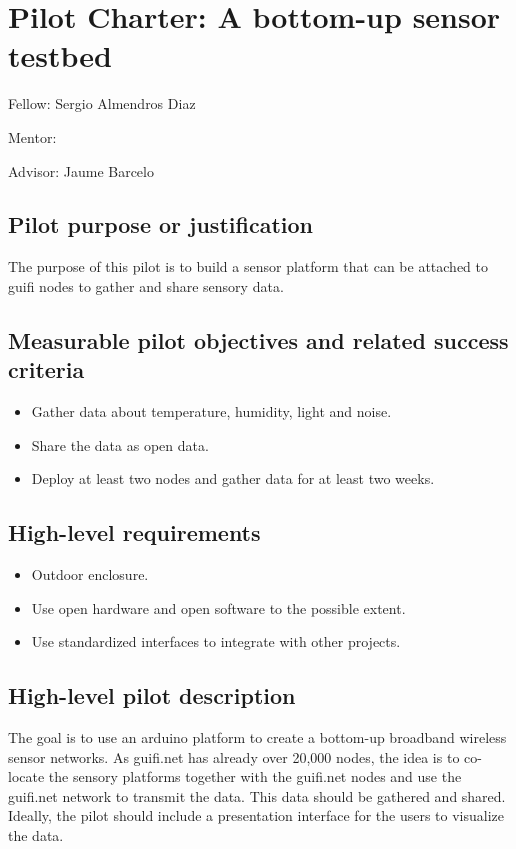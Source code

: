 \documentclass[10pt,a4paper]{article}
\begin{document}
\section{Pilot Charter: A bottom-up sensor testbed}
\label{sec:mnp}

Fellow: Sergio Almendros Diaz

Mentor: 

Advisor: Jaume Barcelo

\subsection{Pilot purpose or justification}
The purpose of this pilot is to build a sensor platform that can be attached to guifi nodes to gather and share sensory data.

\subsection{Measurable pilot objectives and related success criteria}
\begin{itemize}
\item Gather data about temperature, humidity, light and noise. 
\item Share the data as open data.
\item Deploy at least two nodes and gather data for at least two weeks.
\end{itemize}

\subsection{High-level requirements}
\begin{itemize}
\item Outdoor enclosure.
\item Use open hardware and open software to the possible extent.
\item Use standardized interfaces to integrate with other projects.
\end{itemize}

\subsection{High-level pilot description}
The goal is to use an arduino platform to create a bottom-up broadband wireless sensor networks. 
As guifi.net has already over 20,000 nodes, the idea is to co-locate the sensory platforms together with the guifi.net nodes and use the guifi.net network to transmit the data.
This data should be gathered and shared.
Ideally, the pilot should include a presentation interface for the users to visualize the data.
\end{document}
